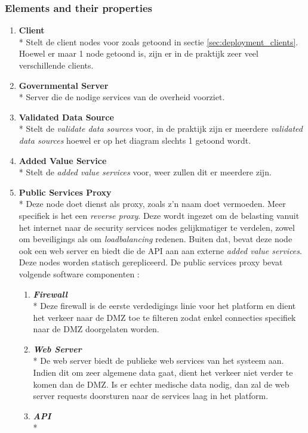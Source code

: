 \documentclass[a4paper,10pt]{article}
\begin{document}
\subsubsection{Elements and their properties}
\begin{enumerate}
 \item \textbf{Client}\\*
Stelt de client nodes voor zoals getoond in sectie \ref{sec:deployment_clients}. Hoewel er maar 1 node getoond is, zijn er in de praktijk zeer veel verschillende clients.
\item \textbf{Governmental Server}\\*
Server die de nodige services van de overheid voorziet.
\item \textbf{Validated Data Source}\\*
Stelt de \textit{validate data sources} voor, in de praktijk zijn er meerdere \textit{validated data sources} hoewel er op het diagram slechts 1 getoond wordt.
\item \textbf{Added Value Service}\\*
Stelt de \textit{added value services} voor, weer zullen dit er meerdere zijn.
\item \textbf{Public Services Proxy}\\*
Deze node doet dienst als proxy, zoals z'n naam doet vermoeden. Meer specifiek is het een \textit{reverse proxy}. Deze wordt ingezet om de belasting vanuit het internet naar de security services nodes gelijkmatiger te verdelen, zowel om beveiligings als om \textit{loadbalancing} redenen. Buiten dat, bevat deze node ook een web server en biedt die de API aan aan externe \textit{added value services}. Deze nodes worden statisch gerepliceerd. De public services proxy bevat volgende software componenten : 
\begin{enumerate}
 \item \textit{\textbf{Firewall}}\\*
 Deze firewall is de eerste verdedigings linie voor het platform en dient het verkeer naar de DMZ toe te filteren zodat enkel connecties specifiek naar de DMZ doorgelaten worden.
\item \textit{\textbf{Web Server}}\\*
De web server biedt de publieke web services van het systeem aan. Indien dit om zeer algemene data gaat, dient het verkeer niet verder te komen dan de DMZ. Is er echter medische data nodig, dan zal de web server requests doorsturen naar de services laag in het platform.
\item \textit{\textbf{API}}\\*

\end{enumerate}
\end{enumerate}
\end{document}
